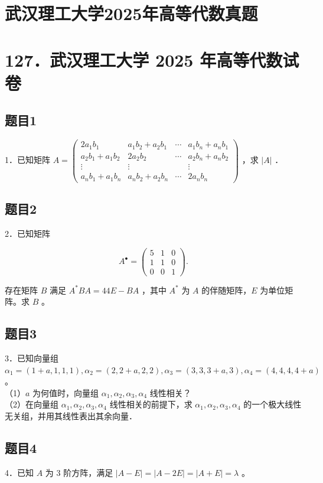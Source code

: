 \documentclass{article}
\begin{document}
\section*{武汉理工大学2025年高等代数真题}
\section*{127．武汉理工大学 2025 年高等代数试卷}

\subsection{题目1}
1．已知矩阵 \(A=\left(\begin{array}{cccc}2 a_{1} b_{1} & a_{1} b_{2}+a_{2} b_{1} & \cdots & a_{1} b_{n}+a_{n} b_{1} \\ a_{2} b_{1}+a_{1} b_{2} & 2 a_{2} b_{2} & \cdots & a_{2} b_{n}+a_{n} b_{2} \\ \vdots & \vdots & & \vdots \\ a_{n} b_{1}+a_{1} b_{n} & a_{n} b_{2}+a_{2} b_{n} & \cdots & 2 a_{n} b_{n}\end{array}\right)\) ，求 \(|A|\) ．

\subsection{题目2}
2．已知矩阵

\[
A^{\bullet}=\left(\begin{array}{lll}
5 & 1 & 0 \\
1 & 1 & 0 \\
0 & 0 & 1
\end{array}\right) .
\]

存在矩阵 \(B\) 满足 \(A^{*} B A=44 E-B A\) ，其中 \(A^{*}\) 为 \(A\) 的伴随矩阵，\(E\) 为单位矩阵。求 \(B\) 。

\subsection{题目3}
3．已知向量组 \(\alpha_{1}=(1+a, 1,1,1), \alpha_{2}=(2,2+a, 2,2), \alpha_{3}=(3,3,3+a, 3), \alpha_{4}=(4,4,4,4+a)\) 。\\
（1）\(a\) 为何值时，向量组 \(\alpha_{1}, \alpha_{2}, \alpha_{3}, \alpha_{4}\) 线性相关？\\
（2）在向量组 \(\alpha_{1}, \alpha_{2}, \alpha_{3}, \alpha_{4}\) 线性相关的前提下，求 \(\alpha_{1}, \alpha_{2}, \alpha_{3}, \alpha_{4}\) 的一个极大线性无关组，并用其线性表出其余向量．

\subsection{题目4}
4．已知 \(A\) 为 3 阶方阵，满足 \(|A-E|=|A-2 E|=|A+E|=\lambda\) 。
\end{document}
